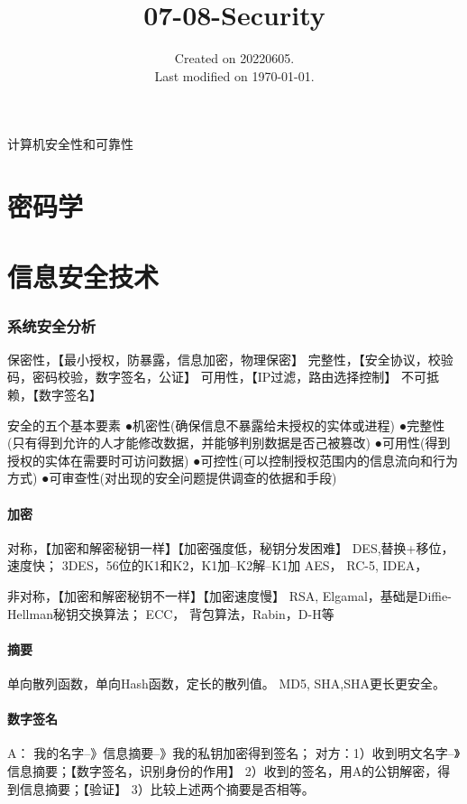 \documentclass[UTF8]{../computerUniverse}
\begin{document}
\title{07-08-Security}
\date{Created on 20220605.\\   Last modified on \today.}
\maketitle
\tableofcontents


计算机安全性和可靠性


\chapter{密码学}


\chapter{信息安全技术}


\subsection{系统安全分析}
保密性，【最小授权，防暴露，信息加密，物理保密】
完整性，【安全协议，校验码，密码校验，数字签名，公证】
可用性，【IP过滤，路由选择控制】
不可抵赖，【数字签名】


安全的五个基本要素
●机密性(确保信息不暴露给未授权的实体或进程)
●完整性(只有得到允许的人才能修改数据，并能够判别数据是否己被篡改)
●可用性(得到授权的实体在需要时可访问数据)
●可控性(可以控制授权范围内的信息流向和行为方式)
●可审查性(对出现的安全问题提供调查的依据和手段)


\subsubsection{加密}
对称，【加密和解密秘钥一样】【加密强度低，秘钥分发困难】
DES,替换+移位，速度快；
3DES，56位的K1和K2，K1加--K2解--K1加 
AES，
RC-5,
IDEA，


非对称，【加密和解密秘钥不一样】【加密速度慢】
RSA,
Elgamal，基础是Diffie-Hellman秘钥交换算法；
ECC，
背包算法，Rabin，D-H等


\subsubsection{摘要}

单向散列函数，单向Hash函数，定长的散列值。
MD5, SHA,SHA更长更安全。


\subsubsection{数字签名}
A： 我的名字--》信息摘要--》我的私钥加密得到签名；
对方：1）收到明文名字--》信息摘要；【数字签名，识别身份的作用】
      2）收到的签名，用A的公钥解密，得到信息摘要；【验证】
      3）比较上述两个摘要是否相等。
\end{document}
